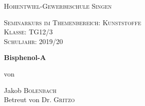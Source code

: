 \begin{titlepage}
	\centering
	
	{\scshape\LARGE Hohentwiel-Gewerbeschule Singen \par}
	\vspace{1cm}
	{\scshape\Large Seminarkurs im Themenbereich: Kunststoffe  \\Klasse: TG12/3 \\Schuljahr: 2019/20\par}
	\vspace{1.5cm}
	{\huge\bfseries Bisphenol-A\par}
	\vspace{2cm}
	{\Large\itshape \par}
	\vfill
	von\par
	Jakob \textsc{Bolenbach}
	\\Betreut von Dr. \textsc{Gritzo}
	\vfill


\end{titlepage}